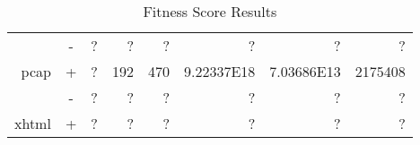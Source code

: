 \begin{table}[H]
\begin{tabular}{|r|c|r|r|r|r|r|r|}
                               & -                                                                           &              ?                                                              &                             ?                                                 &                                ?                                             &                                         ?                                    &                                        ?                                        &                                 ?                                              \\ \cline{2-8} 
\multirow{-2}{*}{pcap}         & \cellcolor[HTML]{C0C0C0}+                                                   & \cellcolor[HTML]{C0C0C0} ?                                                  & \cellcolor[HTML]{C0C0C0} 192                                                  & \cellcolor[HTML]{C0C0C0} 470                                                 & \cellcolor[HTML]{C0C0C0} 9.22337E18                                          & \cellcolor[HTML]{C0C0C0} 7.03686E13                                             & \cellcolor[HTML]{C0C0C0} 2175408                                               \\ \hline \hline
                               & -                                                                           &       ?                                                                     &                              ?                                                &                                 ?                                            &                                        ?                                     &                                         ?                                       &                                      ?                                         \\ \cline{2-8} 
\multirow{-2}{*}{xhtml}        & \cellcolor[HTML]{C0C0C0}+                                                   & \cellcolor[HTML]{C0C0C0}    ?                                               & \cellcolor[HTML]{C0C0C0} ?                                                    & \cellcolor[HTML]{C0C0C0}  ?                                                  & \cellcolor[HTML]{C0C0C0}    ?                                                & \cellcolor[HTML]{C0C0C0}  ?                                                     & \cellcolor[HTML]{C0C0C0}   ?                                                   \\ \hline
\end{tabular}
\caption{Fitness Score Results}
\label{tbl:fitness}
\end{table}


